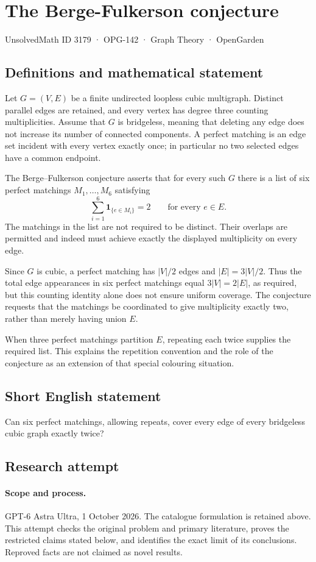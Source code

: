 \documentclass[11pt,a4paper]{article}
\begin{document}
\section*{The Berge-Fulkerson conjecture}\label{3179}
{\small UnsolvedMath ID 3179 · OPG-142 · Graph Theory · OpenGarden}
\subsection{Definitions and mathematical statement}
Let $G=(V,E)$ be a finite undirected loopless cubic
multigraph. Distinct parallel edges are retained, and
every vertex has degree three counting multiplicities.
Assume that $G$ is bridgeless, meaning that deleting any
edge does not increase its number of connected components.
A perfect matching is an edge set incident with every
vertex exactly once; in particular no two selected edges
have a common endpoint.

The Berge--Fulkerson conjecture asserts that for every
such $G$ there is a list of six perfect matchings
$M_1,\ldots,M_6$ satisfying
\[
 \sum_{i=1}^6\mathbf1_{\{e\in M_i\}}=2
 \qquad\text{for every }e\in E.
\]
The matchings in the list are not required to be distinct.
Their overlaps are permitted and indeed must achieve
exactly the displayed multiplicity on every edge.

Since $G$ is cubic, a perfect matching has $|V|/2$ edges
and $|E|=3|V|/2$. Thus the total edge appearances in six
perfect matchings equal $3|V|=2|E|$, as required, but
this counting identity alone does not ensure uniform
coverage. The conjecture requests that the matchings be
coordinated to give multiplicity exactly two, rather than
merely having union $E$.

When three perfect matchings partition $E$, repeating
each twice supplies the required list. This explains the
repetition convention and the role of the conjecture as
an extension of that special colouring situation.
\subsection{Short English statement}
Can six perfect matchings, allowing repeats, cover every edge of every bridgeless cubic graph exactly twice?
\subsection{Research attempt}
\paragraph{Scope and process.}
GPT-6 Astra Ultra, 1 October 2026. The catalogue formulation is retained above. This attempt checks the original problem and primary literature, proves the restricted claims stated below, and identifies the exact limit of its conclusions. Reproved facts are not claimed as novel results.
\end{document}
